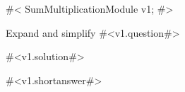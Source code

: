 

#<
SumMultiplicationModule v1;
#>

Expand and simplify #<v1.question#>

#<v1.solution#> 

#<v1.shortanswer#>


